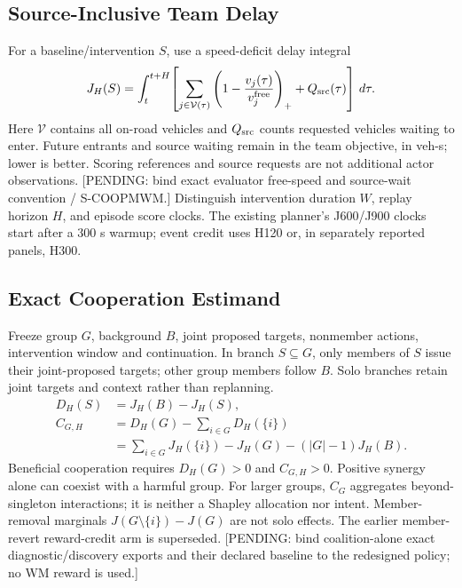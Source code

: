 \documentclass[conference]{IEEEtran}
\newcommand{\pending}[1]{\textcolor{red!80!black}{[PENDING: #1]}}
\newcommand{\cg}{C_{G,H}}
\begin{document}
\subsection{Source-Inclusive Team Delay}
For a baseline/intervention $S$, use a speed-deficit delay integral
\begin{equation}
J_H(S)=\int_t^{t+H}\!\left[\sum_{j\in\mathcal V(\tau)}
\left(1-\frac{v_j(\tau)}{v^{\rm free}_j}\right)_+
+Q_{\rm src}(\tau)\right]\,d\tau .
\label{eq:cost}
\end{equation}
Here $\mathcal V$ contains all on-road vehicles and $Q_{\rm src}$ counts
requested vehicles waiting to enter. Future entrants and source waiting
remain in the team objective, in veh-s; lower is better.
Scoring references and source requests are not additional actor observations.
\pending{bind exact evaluator free-speed and source-wait convention /
S-COOPMWM.}
Distinguish intervention duration $W$, replay horizon $H$, and episode score
clocks. The existing planner's
J600/J900 clocks start after a $300$ s warmup; event credit uses H120 or,
in separately reported panels, H300.

\subsection{Exact Cooperation Estimand}
Freeze group $G$, background $B$, joint proposed targets, nonmember actions,
intervention window and continuation. In branch $S\subseteq G$, only members
of $S$ issue their joint-proposed targets; other group members follow $B$.
Solo branches retain joint targets and context rather than replanning.
\begin{align}
D_H(S)&=J_H(B)-J_H(S),\\
\cg&=D_H(G)-\sum_{i\in G}D_H(\{i\})\label{eq:synergy}\\
&=\sum_{i\in G}J_H(\{i\})-J_H(G)-(|G|-1)J_H(B).\nonumber
\end{align}
Beneficial cooperation requires $D_H(G)>0$ and $\cg>0$. Positive synergy
alone can coexist with a harmful group. For larger groups, $C_G$ aggregates
beyond-singleton interactions; it is neither a Shapley allocation nor intent.
Member-removal marginals $J(G\setminus\{i\})-J(G)$ are not solo effects.
The earlier member-revert reward-credit arm is superseded.
\pending{bind coalition-alone exact diagnostic/discovery exports and their
declared baseline to the redesigned policy; no WM reward is used.}
\end{document}
